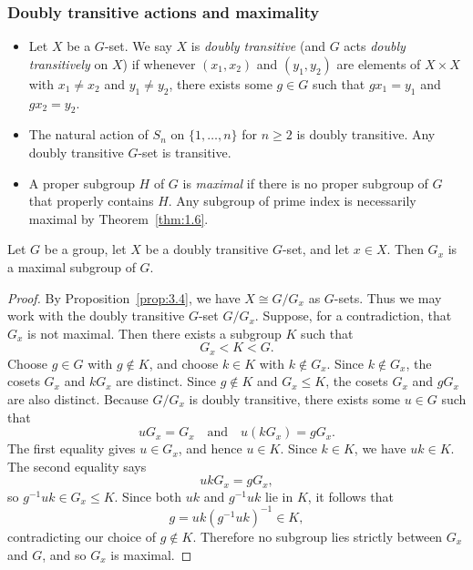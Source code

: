 \documentclass[../Odyssey_Project.tex]{subfiles}
\begin{document}
\subsubsection*{Doubly transitive actions and maximality}
\begin{itemize}
    \item Let $X$ be a $G$-set. We say $X$ is \emph{doubly transitive} (and $G$ acts \emph{doubly transitively} on $X$) if whenever $(x_1, x_2)$ and $(y_1, y_2)$ are elements of $X \times X$ with $x_1 \neq x_2$ and $y_1 \neq y_2$, there exists some $g \in G$ such that $gx_1 = y_1$ and $gx_2 = y_2$.
    \item The natural action of $S_n$ on $\{1, \dots, n\}$ for $n \geq 2$ is doubly transitive. Any doubly transitive $G$-set is transitive.
    \item A proper subgroup $H$ of $G$ is \emph{maximal} if there is no proper subgroup of $G$ that properly contains $H$. Any subgroup of prime index is necessarily maximal by Theorem~\ref{thm:1.6}.
\end{itemize}

\begin{proposition}
\label{prop:3.8}
Let $G$ be a group, let $X$ be a doubly transitive $G$-set, and let $x \in X$. Then $G_x$ is a maximal subgroup of $G$.
\end{proposition}

\begin{proof}
    By Proposition~\ref{prop:3.4}, we have $X \cong G/G_x$ as $G$-sets. Thus we may work with the doubly transitive $G$-set $G/G_x$. Suppose, for a contradiction, that $G_x$ is not maximal. Then there exists a subgroup $K$ such that
    \[
        G_x < K < G.
    \]
    Choose $g \in G$ with $g \notin K$, and choose $k \in K$ with $k \notin G_x$. Since $k \notin G_x$, the cosets $G_x$ and $kG_x$ are distinct. Since $g \notin K$ and $G_x \leq K$, the cosets $G_x$ and $gG_x$ are also distinct.
    Because $G/G_x$ is doubly transitive, there exists some $u \in G$ such that
    \[
        uG_x = G_x
        \quad\text{and}\quad
        u(kG_x) = gG_x.
    \]
    The first equality gives $u \in G_x$, and hence $u \in K$. Since $k \in K$, we have $uk \in K$. The second equality says
    \[
        ukG_x = gG_x,
    \]
    so $g^{-1}uk \in G_x \leq K$. Since both $uk$ and $g^{-1}uk$ lie in $K$, it follows that
    \[
        g = uk(g^{-1}uk)^{-1} \in K,
    \]
    contradicting our choice of $g \notin K$. Therefore no subgroup lies strictly between $G_x$ and $G$, and so $G_x$ is maximal.
\end{proof}
\end{document}
